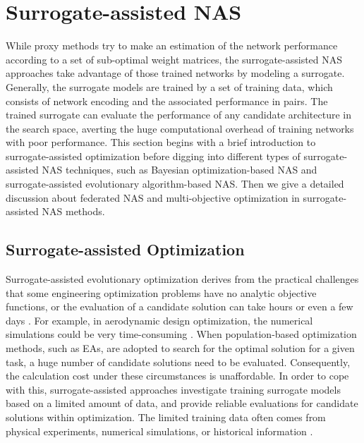 \documentclass[journal]{IEEEtran}
\begin{document}
\section{Surrogate-assisted NAS}

While proxy methods try to make an estimation of the network performance according to a set of sub-optimal weight matrices, the surrogate-assisted NAS approaches take advantage of those trained networks by modeling a surrogate. Generally, the surrogate models are trained by a set of training data, which consists of network encoding and the associated performance in pairs. The trained surrogate can evaluate the performance of any candidate architecture in the search space, averting the huge computational overhead of training networks with poor performance. This section begins with a brief introduction to surrogate-assisted optimization before digging into different types of surrogate-assisted NAS techniques, such as Bayesian optimization-based NAS and surrogate-assisted evolutionary algorithm-based NAS. Then we give a detailed discussion about federated NAS and multi-objective optimization in surrogate-assisted NAS methods.

\subsection{Surrogate-assisted Optimization}

Surrogate-assisted evolutionary optimization derives from the practical challenges that some engineering optimization problems have no analytic objective functions, or the evaluation of a candidate solution can take hours or even a few days \cite{jin2011surrogate, jin2005comprehensive}. For example, in aerodynamic design optimization, the numerical simulations could be very time-consuming \cite{tao2019application}. When population-based optimization methods, such as EAs, are adopted to search for the optimal solution for a given task, a huge number of candidate solutions need to be evaluated. Consequently, the calculation cost under these circumstances is unaffordable. In order to cope with this, surrogate-assisted approaches investigate training surrogate models based on a limited amount of data, and provide reliable evaluations for candidate solutions within optimization. The limited training data often comes from physical experiments, numerical simulations, or historical information \cite{sun2018semi, wang2021transfer, wang2016data}.
\end{document}
